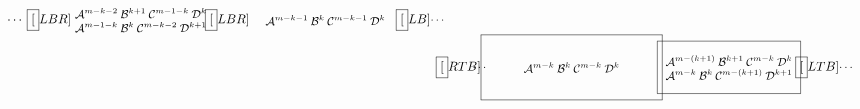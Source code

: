 \documentclass[12pt]{article}
\newcommand{\A}{{\mathcal A}}
\newcommand{\B}{{\mathcal B}}
\newcommand{\C}{{\mathcal C}}
\newcommand{\D}{{\mathcal D}}
\begin{document}
\begin{enumerate}
\begin{equation}
\begin{split}
{\begin{minipage}[c][4.5em][c]{3ex}
                \hspace*{-.7em}\dots
              \end{minipage}
            }\hspace*{-1ex}
            \fbox[LBR]{
              \begin{minipage}[c][3.5em][c]{11em}\small\centering
                $\A^{m-k-2}\:\B^{k+1}\:\C^{m-1-k}    \:\D^{k}$\\
                $\A^{m-1-k}   \:\B^{k}  \:\C^{m-k-2}\:\D^{k+1}$
              \end{minipage}
            }\hspace*{-1ex}
            \fbox[LBR]{
              \begin{minipage}[c][4.5em][c]{12em}\small\centering
                $\A^{m-k-1}\:\B^k\:\C^{m-k-1}\:\D^k$
              \end{minipage}
            }
            \hspace*{-1ex}
            \fbox[LB]{
              \begin{minipage}[c][3.5em][c]{1ex}\small
                \dots
              \end{minipage}
            }\\[-1.5em]
            &
            \fbox[RTB]{
              \begin{minipage}[c][3.5em][c]{1ex}\small
                \hspace*{-.7em}\dots
              \end{minipage}
            }
            \hspace*{-1ex}
            \fbox{
              \begin{minipage}[c][4.5em][c]{13em}\small\centering
                $\A^{m-k}\:\B^k\:\C^{m-k}\:\D^k$
              \end{minipage}
            }
            \hspace*{-1ex}
            \fbox{
              \begin{minipage}[c][3.5em][c]{10em}\small\centering
                $\A^{m-(k+1)}\:\B^{k+1}\:\C^{m-k}    \:\D^{k}$\\
                $\A^{m-k}   \:\B^{k}  \:\C^{m-(k+1)}\:\D^{k+1}$
              \end{minipage}
            }
            \hspace*{-1ex}
            \fbox[LTB]{
              \begin{minipage}[c][4.5em][c]{4ex}\small
                \dots
              \end{minipage}
}
\end{split}
\end{equation}
\end{enumerate}
\end{document}
